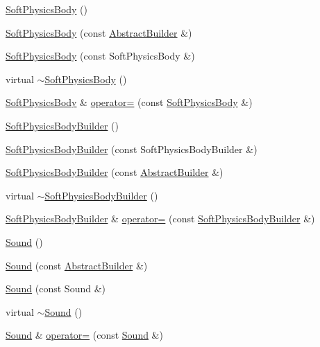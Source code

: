 \begin{DoxyCompactItemize}
\item 
\hyperlink{namespacejli_aed705521735ec0576f0f60c9ae054900}{Soft\+Physics\+Body} ()
\item 
\hyperlink{namespacejli_a082f75258bea5abb34e47b3461e0ac3e}{Soft\+Physics\+Body} (const \hyperlink{classjli_1_1_abstract_builder}{Abstract\+Builder} \&)
\item 
\hyperlink{namespacejli_acc65781da8e2beedcb7d67da5fbe2755}{Soft\+Physics\+Body} (const Soft\+Physics\+Body \&)
\item 
virtual \hyperlink{namespacejli_a8e8c1bf22ec4b0dadead7d9c2633d256}{$\sim$\+Soft\+Physics\+Body} ()
\item 
\hyperlink{namespacejli_aed705521735ec0576f0f60c9ae054900}{Soft\+Physics\+Body} \& \hyperlink{namespacejli_a07d05181deadb4a4884964a1c99dffcc}{operator=} (const \hyperlink{namespacejli_aed705521735ec0576f0f60c9ae054900}{Soft\+Physics\+Body} \&)
\item 
\hyperlink{namespacejli_a1596ed752f8057aa2c390fb879ed1d5c}{Soft\+Physics\+Body\+Builder} ()
\item 
\hyperlink{namespacejli_ab1b8f8c888e632824010285cca255866}{Soft\+Physics\+Body\+Builder} (const Soft\+Physics\+Body\+Builder \&)
\item 
\hyperlink{namespacejli_a9f48cdfff9248066abff6b469fa95d97}{Soft\+Physics\+Body\+Builder} (const \hyperlink{classjli_1_1_abstract_builder}{Abstract\+Builder} \&)
\item 
virtual \hyperlink{namespacejli_a73c426df713e3091ef65a47329d3ff81}{$\sim$\+Soft\+Physics\+Body\+Builder} ()
\item 
\hyperlink{namespacejli_a1596ed752f8057aa2c390fb879ed1d5c}{Soft\+Physics\+Body\+Builder} \& \hyperlink{namespacejli_aa8702a258b02f9e14dcf8c67fa6a01e6}{operator=} (const \hyperlink{namespacejli_a1596ed752f8057aa2c390fb879ed1d5c}{Soft\+Physics\+Body\+Builder} \&)
\item 
\hyperlink{namespacejli_adde185173fc24f7fd6b0d882a8fa471a}{Sound} ()
\item 
\hyperlink{namespacejli_a0607478917c0dad447f434e0618be1d2}{Sound} (const \hyperlink{classjli_1_1_abstract_builder}{Abstract\+Builder} \&)
\item 
\hyperlink{namespacejli_aa43a8bc567a341ac22b4eb9777fa180f}{Sound} (const Sound \&)
\item 
virtual \hyperlink{namespacejli_a7ea6e34ab8f27d80c3a1e815d66ac26a}{$\sim$\+Sound} ()
\item 
\hyperlink{namespacejli_adde185173fc24f7fd6b0d882a8fa471a}{Sound} \& \hyperlink{namespacejli_aca4f80875a035dcd8150d8b0b9d9bc4f}{operator=} (const \hyperlink{namespacejli_adde185173fc24f7fd6b0d882a8fa471a}{Sound} \&)

\end{DoxyCompactItemize}
